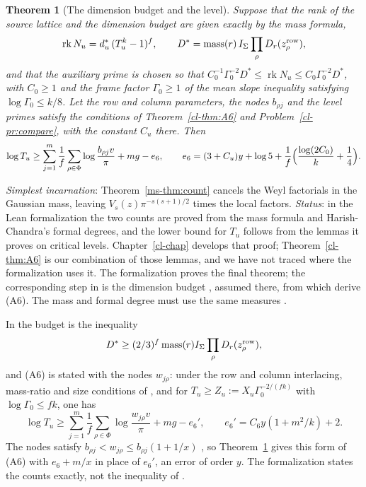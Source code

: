 \documentclass[reqno]{amsart}
\newcounter{chap}
\theoremstyle{definition}
\theoremstyle{plain}
\newtheorem{theorem}{Theorem}[section]
\newcommand{\mass}{\operatorname{mass}}
\begin{document}
\begin{theorem}[The dimension budget and the level]\label{in:A6}
Suppose that the rank of the source lattice and the dimension budget are
given exactly by the mass formula,
\[
 \operatorname{rk}N_u=d_u^*\,(T_u^k-1)^f,\qquad
 D^*=\mass(r)\,I_\Sigma\prod_\rho D_r(z^{\rm row}_\rho),
\]
and that the auxiliary prime is chosen so that
$C_0^{-1}\Gamma_0^{-2}D^*\le\operatorname{rk}N_u\le C_0\Gamma_0^{-2}D^*$,
with $C_0\ge1$ and the frame factor $\Gamma_0\ge1$ of the mean slope
inequality satisfying $\log\Gamma_0\le k/8$.  Let the row and column
parameters, the nodes $b_{\rho j}$ and the level primes satisfy the
conditions of Theorem~\ref{cl-thm:A6} and Problem~\ref{cl-pr:compare},
with the constant $C_u$ there.  Then
\[
 \log T_u\ge\sum_{j=1}^m\frac1f\sum_{\rho\in\Phi}
                    \log\frac{b_{\rho j}v}{\pi}+mg-e_6,
 \qquad e_6=(3+C_u)y+\log5+\frac1f\Bigl(\frac{\log(2C_0)}k+\frac14\Bigr).
\]
\end{theorem}
\noindent\emph{Simplest incarnation}: Theorem~\ref{ms-thm:count} cancels the Weyl
factorials in the Gaussian mass, leaving $V_s(z)\pi^{-s(s+1)/2}$
times the local factors.  \emph{Status}: in the Lean formalization
\cite{Lean} the two counts are proved from the mass formula and
Harish-Chandra's formal degrees, and the lower bound for $T_u$ follows
from the lemmas it proves on critical levels.  Chapter~\ref{cl-chap}
develops that proof; Theorem~\ref{cl-thm:A6} is our combination of those
lemmas, and we have not traced where the formalization uses it.  The
formalization proves the final theorem; the corresponding step in
\cite{Adr} is the dimension budget \cite[Hyp.~15.23]{Adr}, assumed there,
from which \cite[Prop.~15.25, Thm.~15.26]{Adr} derive (A6).  The mass and
formal degree must use the same measures \cite[\S18.7]{Adr}.

In \cite{Adr} the budget is the inequality
\[
 D^*\ge(2/3)^f\mass(r)I_\Sigma\prod_\rho D_r(z^{\rm row}_\rho),
\]
and (A6) is stated with the nodes $w_{j\rho}$: under the row and column
interlacing, mass-ratio and size conditions of
\cite[Prop.~15.25]{Adr}, and for $T_u\ge Z_u:=X_u\Gamma_0^{-2/(fk)}$
with $\log\Gamma_0\le fk$, one has
\[
 \log T_u\ge\sum_{j=1}^m\frac1f\sum_{\rho\in\Phi}
                    \log\frac{w_{j\rho}v}{\pi}+mg-e_6',
 \qquad e_6'=C_6y(1+m^2/k)+2 .
\]
The nodes satisfy $b_{\rho j}<w_{j\rho}\le b_{\rho j}(1+1/x)$
\cite[\S15.6, (P4)]{Adr}, so Theorem~\ref{in:A6} gives this form of (A6) with
$e_6+m/x$ in place of $e_6'$, an error of order $y$.  The formalization
states the counts exactly, not the inequality of \cite[Hyp.~15.23]{Adr}.
\end{document}
